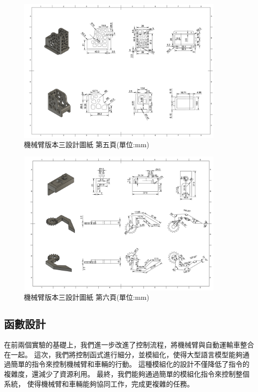 \documentclass[class=NCU_thesis, crop=false]{standalone}
\begin{document}
\begin{figure}[htbp]
    \centering
    \includegraphics[width=0.9\textwidth]{figures/Armv3 (5).PNG}
    \caption{機械臂版本三設計圖紙 第五頁(單位:mm)}
\end{figure}

\begin{figure}[htbp]
    \centering
    \includegraphics[width=0.9\textwidth]{figures/Armv3 (6).PNG}
    \caption{機械臂版本三設計圖紙 第六頁(單位:mm)}
\end{figure}


\subsection{函數設計}
在前兩個實驗的基礎上，我們進一步改進了控制流程，將機械臂與自動運輸車整合在一起。
這次，我們將控制函式進行細分，並模組化，使得大型語言模型能夠通過簡單的指令來控制機械臂和車輛的行動。
這種模組化的設計不僅降低了指令的複雜度，還減少了資源利用。
最終，我們能夠通過簡單的模組化指令來控制整個系統，
使得機械臂和車輛能夠協同工作，完成更複雜的任務。
\end{document}

